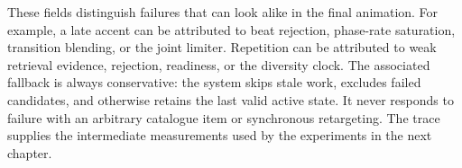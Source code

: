 These fields distinguish failures that can look alike in the final animation.
For example, a late accent can be attributed to beat rejection, phase-rate
saturation, transition blending, or the joint limiter. Repetition can be
attributed to weak retrieval evidence, rejection, readiness, or the diversity
clock. The associated fallback is always conservative: the system skips stale
work, excludes failed candidates, and otherwise retains the last valid active
state. It never responds to failure with an arbitrary catalogue item or
synchronous retargeting. The trace supplies the intermediate measurements used
by the experiments in the next chapter.
